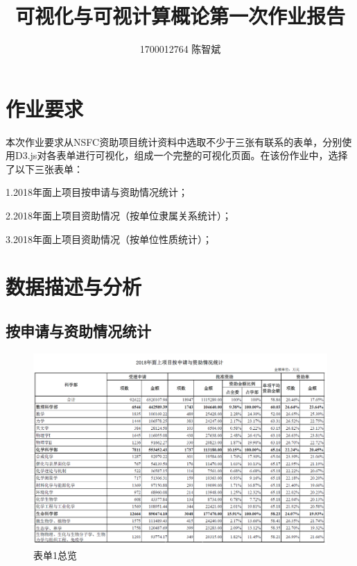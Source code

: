 \documentclass[a4paper,11pt,UTF8]{ctexart}
\begin{document}
\title{可视化与可视计算概论第一次作业报告}
\author{1700012764 陈智斌}

\maketitle
\tableofcontents

\newpage

\section{作业要求}

本次作业要求从NSFC资助项目统计资料中选取不少于三张有联系的表单，分别使用D3.js对各表单进行可视化，组成一个完整的可视化页面。在该份作业中，选择了以下三张表单：

1.2018年面上项目按申请与资助情况统计；

2.2018年面上项目资助情况（按单位隶属关系统计）；

3.2018年面上项目资助情况（按单位性质统计）；

\section{数据描述与分析}

\subsection{按申请与资助情况统计}

\begin{figure}[ht]
\centering
\includegraphics[scale=0.25]{QQ20191028140117.png}
\caption{表单1总览}
\end{figure}
\end{document}

